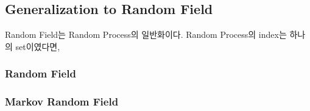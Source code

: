 \documentclass[twoside]{article}
\theoremstyle{definition}
\begin{document}



\subsection{Generalization to Random Field} 

Random Field는 Random Process의 일반화이다. Random Process의 index는 하나의 set이였다면, 

\subsubsection{Random Field}


\subsubsection{Markov Random Field}







\end{document}
